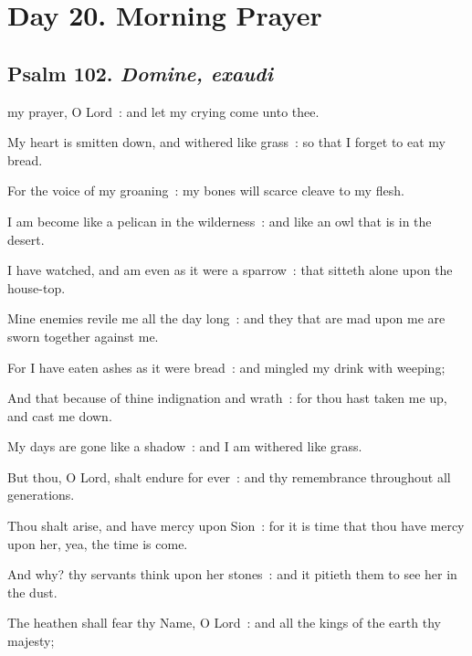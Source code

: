 \section*{Day 20. Morning Prayer}

\subsection{Psalm 102. \textit{Domine, exaudi}}

 my prayer, O Lord~: and let my crying come unto thee.\par
{}
My heart is smitten down, and withered like grass~: so that I forget to eat my bread.\par
{}For the voice of my groaning~: my bones will scarce cleave to my flesh.\par
{}I am become like a pelican in the wilderness~: and like an owl that is in the desert.\par
{}I have watched, and am even as it were a sparrow~: that sitteth alone upon the house-top.\par
{}Mine enemies revile me all the day long~: and they that are mad upon me are sworn together against me.\par
{}For I have eaten ashes as it were bread~: and mingled my drink with weeping;\par
{}And that because of thine indignation and wrath~: for thou hast taken me up, and cast me down.\par
{}My days are gone like a shadow~: and I am withered like grass.\par
{}But thou, O Lord, shalt endure for ever~: and thy remembrance throughout all generations.\par
{}Thou shalt arise, and have mercy upon Sion~: for it is time that thou have mercy upon her, yea, the time is come.\par
{}And why? thy servants think upon her stones~: and it pitieth them to see her in the dust.\par
{}The heathen shall fear thy Name, O Lord~: and all the kings of the earth thy majesty;\par
